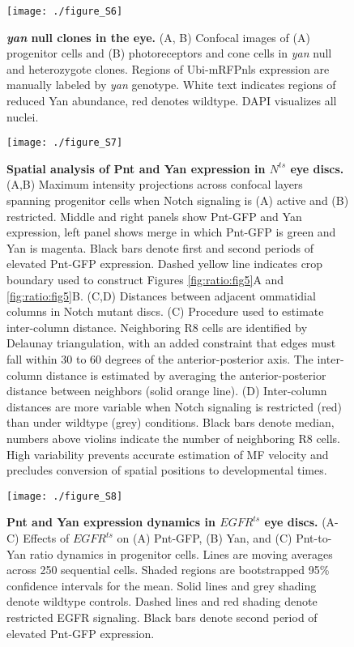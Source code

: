 \begin{figure}[h]
\centering
\texttt{[image: ./figure\_S6]}
\caption[\textit{yan} null clones in the eye.]{\textbf{\textit{yan} null clones in the eye.} (A, B) Confocal images of (A) progenitor cells and (B) photoreceptors and cone cells in \textit{yan} null and heterozygote clones. Regions of Ubi-mRFPnls expression are manually labeled by \textit{yan} genotype. White text indicates regions of reduced Yan abundance, red denotes wildtype. DAPI visualizes all nuclei.}
\label{fig:ratio:figS6}
\end{figure}

\begin{figure}[h]
\centering
\texttt{[image: ./figure\_S7]}
\caption[Spatial analysis of Pnt and Yan expression in $N^{ts}$ eye discs.]{\textbf{Spatial analysis of Pnt and Yan expression in $N^{ts}$ eye discs.} (A,B) Maximum intensity projections across confocal layers spanning progenitor cells when Notch signaling is (A) active and (B) restricted. Middle and right panels show Pnt-GFP and Yan expression, left panel shows merge in which Pnt-GFP is green and Yan is magenta. Black bars denote first and second periods of elevated Pnt-GFP expression. Dashed yellow line indicates crop boundary used to construct Figures \ref{fig:ratio:fig5}A and \ref{fig:ratio:fig5}B. (C,D) Distances between adjacent ommatidial columns in Notch mutant discs. (C) Procedure used to estimate inter-column distance. Neighboring R8 cells are identified by Delaunay triangulation, with an added constraint that edges must fall within 30 to 60 degrees of the anterior-posterior axis. The inter-column distance is estimated by averaging the anterior-posterior distance between neighbors (solid orange line). (D) Inter-column distances are more variable when Notch signaling is restricted (red) than under wildtype (grey) conditions. Black bars denote median, numbers above violins indicate the number of neighboring R8 cells. High variability prevents accurate estimation of MF velocity and precludes conversion of spatial positions to developmental times.}
\label{fig:ratio:figS7}
\end{figure}

\begin{figure}[h]
\centering
\texttt{[image: ./figure\_S8]}
\caption[Pnt and Yan expression dynamics in $EGFR^{ts}$ eye discs.]{\textbf{Pnt and Yan expression dynamics in $EGFR^{ts}$ eye discs.} (A-C) Effects of $EGFR^{ts}$ on (A) Pnt-GFP, (B) Yan, and (C) Pnt-to-Yan ratio dynamics in progenitor cells. Lines are moving averages across 250 sequential cells. Shaded regions are bootstrapped 95\% confidence intervals for the mean. Solid lines and grey shading denote wildtype controls. Dashed lines and red shading denote restricted EGFR signaling. Black bars denote second period of elevated Pnt-GFP expression.}
\label{fig:ratio:figS8}
\end{figure}
